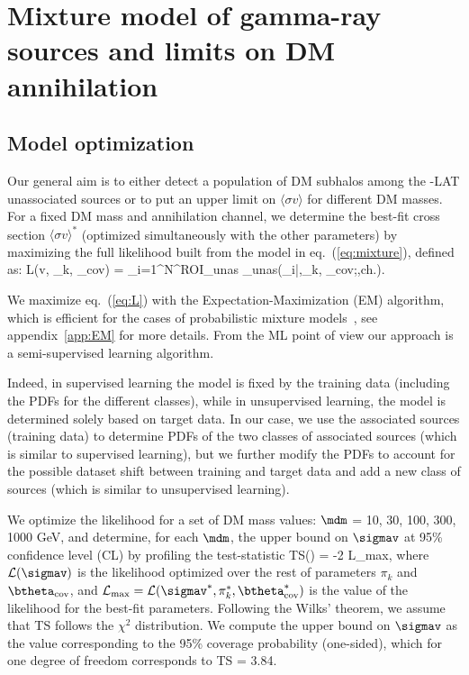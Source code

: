 \section{Mixture model of gamma-ray sources and limits on DM annihilation}
\label{sec:halos:results}

\subsection{Model optimization}
\label{sec:model-opt}

Our general aim is to either detect a population of DM subhalos among the \Fermi-LAT unassociated sources or to put an upper limit on $\langle\sigma v\rangle$ for different DM masses. For a fixed DM mass and annihilation channel, we determine the best-fit cross section $\langle\sigma v\rangle^*$ (optimized simultaneously with the other parameters) by maximizing the full likelihood built from the model in eq.~(\ref{eq:mixture}), defined as:
\be
\label{eq:L}
{\cal L}(\langle\sigma v\rangle, \pi_k, \btheta_\textrm{cov}) = \prod_{i=1}^{N^\textrm{ROI}_\textrm{unas}} _\textrm{unas}(\bx_i|\sigmav,\pi_k, \btheta_\textrm{cov};\mdm,\textrm{ch.}).
\ee

We maximize eq.~(\ref{eq:L}) with the Expectation-Maximization (EM) algorithm, which is efficient for the cases of probabilistic mixture models~\cite{10.1162/089976602753284446_Saerens}, see appendix~\ref{app:EM} for more details.
From the ML point of view our approach is a semi-supervised learning algorithm.

Indeed, in supervised learning the model is fixed by the training data (including the PDFs for the different classes), while in unsupervised learning, the model is determined solely based on target data.
In our case, we use the associated sources (training data) to determine PDFs of the two classes of associated sources (which is similar to supervised learning), but we further modify the PDFs to account for the possible dataset shift between training and target data and add a new class of sources (which is similar to unsupervised learning).


We optimize the likelihood for a set of DM mass values: $\mdm$ = 10, 30, 100, 300, 1000 GeV, and determine, for each $\mdm$, the upper bound on $\sigmav$ at 95\% confidence level (CL) by profiling the test-statistic 
\be
\textrm{TS}(\sigmav) = -2\ln {}
{{\cal L}_\textrm{max}}, 
\label{eq:halos:TS}
\ee
where ${\cal L}(\sigmav)$ is the likelihood optimized over the rest of parameters $\pi_k$ and $\btheta_\textrm{cov}$, and ${\cal L}_\textrm{max}={\cal L}(\sigmav^*,\pi_k^*,\btheta_\textrm{cov}^*)$ is the value of the likelihood for the best-fit parameters. 
Following the Wilks' theorem, we assume that TS follows the $\chi^2$ distribution. 
We compute the upper bound on $\sigmav$ as the value corresponding to the 95\% coverage probability (one-sided), which for one degree of freedom corresponds to
TS = 3.84.

